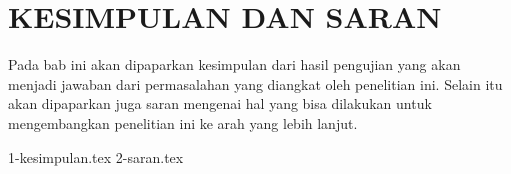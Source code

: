 \chapter{KESIMPULAN DAN SARAN}
\label{chap:penutup}

Pada bab ini akan dipaparkan kesimpulan dari hasil pengujian yang akan menjadi jawaban dari permasalahan yang diangkat oleh penelitian ini.
Selain itu akan dipaparkan juga saran mengenai hal yang bisa dilakukan untuk mengembangkan penelitian ini ke arah yang lebih lanjut.

{1-kesimpulan.tex}
{2-saran.tex}
